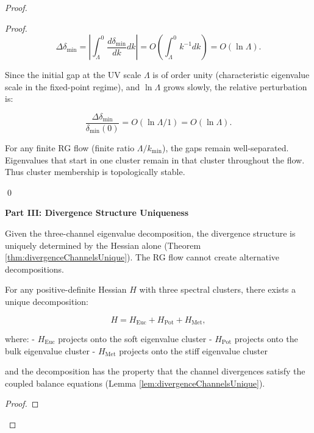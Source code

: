 \begin{proof}
\begin{lemma}
\begin{proof}
\begin{equation}
\Delta \delta_{\min} = \left| \int_\Lambda^0 \frac{d\delta_{\min}}{dk} dk \right| = O\left(\int_\Lambda^0 k^{-1} dk\right) = O(\ln \Lambda).
\end{equation}

Since the initial gap at the UV scale $\Lambda$ is of order unity (characteristic eigenvalue scale in the fixed-point regime), and $\ln \Lambda$ grows slowly, the relative perturbation is:

\begin{equation}
\frac{\Delta \delta_{\min}}{\delta_{\min}(0)} = O(\ln \Lambda / 1) = O(\ln \Lambda).
\end{equation}

For any finite RG flow (finite ratio $\Lambda / k_{\min}$), the gaps remain well-separated. Eigenvalues that start in one cluster remain in that cluster throughout the flow. Thus cluster membership is topologically stable.

\qed

\end{proof}

\end{lemma}

\noindent\textbf{Part III: Divergence Structure Uniqueness}

Given the three-channel eigenvalue decomposition, the divergence structure is uniquely determined by the Hessian alone (Theorem \ref{thm:divergenceChannelsUnique}). The RG flow cannot create alternative decompositions.

\begin{lemma}
\label{lem:decompositionUniqueness}

For any positive-definite Hessian $H$ with three spectral clusters, there exists a unique decomposition:

\begin{equation}
H = H_{\mathrm{Euc}} + H_{\mathrm{Pot}} + H_{\mathrm{Met}},
\end{equation}

where:
- $H_{\mathrm{Euc}}$ projects onto the soft eigenvalue cluster
- $H_{\mathrm{Pot}}$ projects onto the bulk eigenvalue cluster
- $H_{\mathrm{Met}}$ projects onto the stiff eigenvalue cluster

and the decomposition has the property that the channel divergences satisfy the coupled balance equations (Lemma \ref{lem:divergenceChannelsUnique}).

\begin{proof}


\end{proof}
\end{lemma}
\end{proof}
